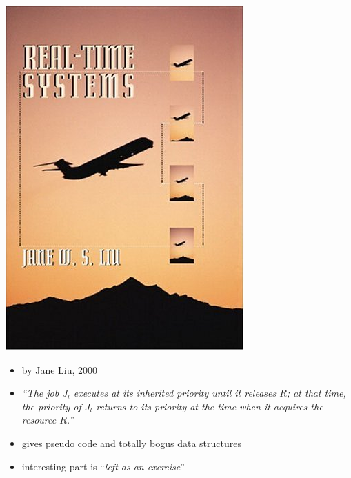 \documentclass[dvipsnames,14pt,t]{beamer}
\begin{document}
  \begin{frame}[c]

  \begin{center}
  \includegraphics[scale=0.25]{pics/p2.jpg}
  \end{center}

   \begin{itemize}
  \item by Jane Liu, 2000
  \item {\it ``The job $J_l$ executes at its inherited 
    priority until it releases $R$; at that time, the 
    priority of $J_l$ returns to its priority 
    at the time when it acquires the resource $R$.''}\medskip
  \item \small gives pseudo code and totally bogus data structures  
  \item \small interesting part is ``{\it left as an exercise}''
  \end{itemize}

  \end{frame}
     
\end{document}
